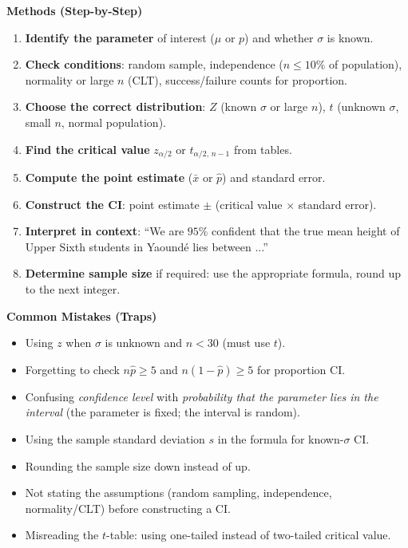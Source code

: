 \documentclass[11pt]{article}
\begin{document}
\begin{bilan}
\textbf{Methods (Step-by-Step)}
\begin{enumerate}
\item \textbf{Identify the parameter} of interest ($\mu$ or $p$) and whether $\sigma$ is known.
\item \textbf{Check conditions}: random sample, independence ($n\le 10\%$ of population), normality or large $n$ (CLT), success/failure counts for proportion.
\item \textbf{Choose the correct distribution}: $Z$ (known $\sigma$ or large $n$), $t$ (unknown $\sigma$, small $n$, normal population).
\item \textbf{Find the critical value} $z_{\alpha/2}$ or $t_{\alpha/2,\,n-1}$ from tables.
\item \textbf{Compute the point estimate} ($\bar{x}$ or $\hat{p}$) and standard error.
\item \textbf{Construct the CI}: point estimate $\pm$ (critical value $\times$ standard error).
\item \textbf{Interpret in context}: ``We are $95\%$ confident that the true mean height of Upper Sixth students in Yaoundé lies between ...''
\item \textbf{Determine sample size} if required: use the appropriate formula, round up to the next integer.
\end{enumerate}

\textbf{Common Mistakes (Traps)}
\begin{itemize}
\item Using $z$ when $\sigma$ is unknown and $n<30$ (must use $t$).
\item Forgetting to check $n\hat{p}\ge5$ and $n(1-\hat{p})\ge5$ for proportion CI.
\item Confusing \emph{confidence level} with \emph{probability that the parameter lies in the interval} (the parameter is fixed; the interval is random).
\item Using the sample standard deviation $s$ in the formula for known-$\sigma$ CI.
\item Rounding the sample size down instead of up.
\item Not stating the assumptions (random sampling, independence, normality/CLT) before constructing a CI.
\item Misreading the $t$-table: using one-tailed instead of two-tailed critical value.
\end{itemize}


\end{bilan}
\end{document}
